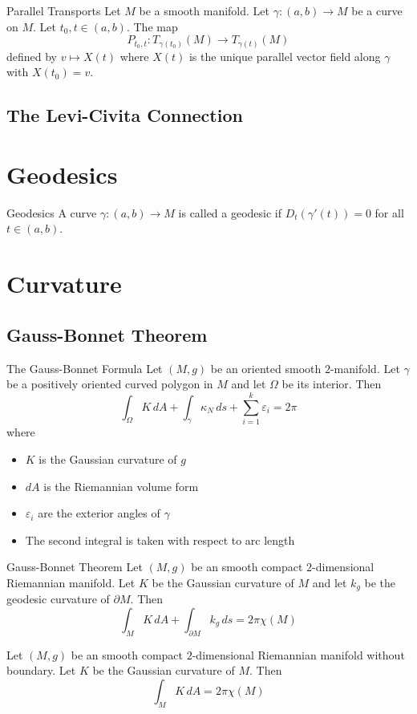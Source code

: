 \documentclass[a4paper]{article}
\begin{document}
\begin{defn}{Parallel Transports}{} Let $M$ be a smooth manifold. Let $\gamma:(a,b)\to M$ be a curve on $M$. Let $t_0,t\in(a,b)$. The map $$P_{t_0,t}:T_{\gamma(t_0)}(M)\to T_{\gamma(t)}(M)$$ defined by $v\mapsto X(t)$ where $X(t)$ is the unique parallel vector field along $\gamma$ with $X(t_0)=v$. 
\end{defn}

\subsection{The Levi-Civita Connection}

\pagebreak
\section{Geodesics}
\begin{defn}{Geodesics}{} A curve $\gamma:(a,b)\to M$ is called a geodesic if $D_t(\gamma'(t))=0$ for all $t\in(a,b)$. 
\end{defn}

\pagebreak
\section{Curvature}
\subsection{Gauss-Bonnet Theorem}
\begin{thm}{The Gauss-Bonnet Formula}{} Let $(M,g)$ be an oriented smooth $2$-manifold. Let $\gamma$ be a positively oriented curved polygon in $M$ and let $\Omega$ be its interior. Then $$\int_\Omega K\,dA+\int_\gamma\kappa_N\,ds+\sum_{i=1}^k\varepsilon_i=2\pi$$ where 
\begin{itemize}
\item $K$ is the Gaussian curvature of $g$
\item $dA$ is the Riemannian volume form
\item $\varepsilon_i$ are the exterior angles of $\gamma$
\item The second integral is taken with respect to arc length
\end{itemize}	
\end{thm}

\begin{thm}{Gauss-Bonnet Theorem}{} Let $(M,g)$ be an smooth compact $2$-dimensional Riemannian manifold. Let $K$ be the Gaussian curvature of $M$ and let $k_g$ be the geodesic curvature of $\partial M$. Then $$\int_MK\,dA+\int_{\partial M}k_g\,ds=2\pi\chi(M)$$
\end{thm}

\begin{crl}{}{} Let $(M,g)$ be an smooth compact $2$-dimensional Riemannian manifold without boundary. Let $K$ be the Gaussian curvature of $M$. Then $$\int_MK\,dA=2\pi\chi(M)$$
\end{crl}
\end{document}
